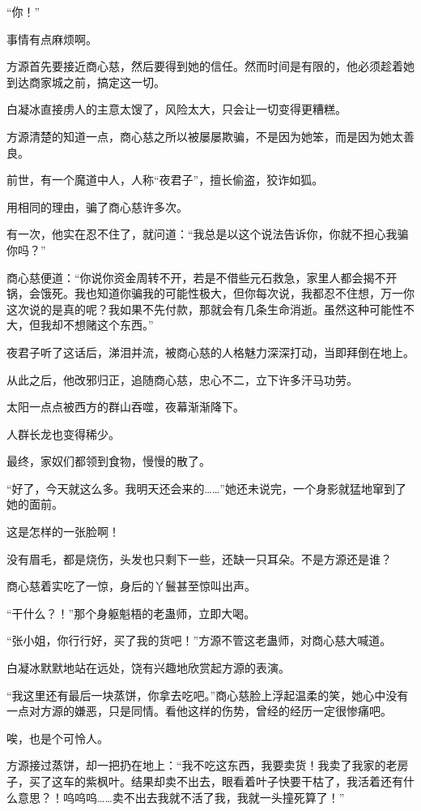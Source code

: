 \begin{this_body}
“你！”

事情有点麻烦啊。

方源首先要接近商心慈，然后要得到她的信任。然而时间是有限的，他必须趁着她到达商家城之前，搞定这一切。

白凝冰直接虏人的主意太馊了，风险太大，只会让一切变得更糟糕。

方源清楚的知道一点，商心慈之所以被屡屡欺骗，不是因为她笨，而是因为她太善良。

前世，有一个魔道中人，人称“夜君子”，擅长偷盗，狡诈如狐。

用相同的理由，骗了商心慈许多次。

有一次，他实在忍不住了，就问道：“我总是以这个说法告诉你，你就不担心我骗你吗？”

商心慈便道：“你说你资金周转不开，若是不借些元石救急，家里人都会揭不开锅，会饿死。我也知道你骗我的可能性极大，但你每次说，我都忍不住想，万一你这次说的是真的呢？我如果不先付款，那就会有几条生命消逝。虽然这种可能性不大，但我却不想赌这个东西。”

夜君子听了这话后，涕泪并流，被商心慈的人格魅力深深打动，当即拜倒在地上。

从此之后，他改邪归正，追随商心慈，忠心不二，立下许多汗马功劳。

太阳一点点被西方的群山吞噬，夜幕渐渐降下。

人群长龙也变得稀少。

最终，家奴们都领到食物，慢慢的散了。

“好了，今天就这么多。我明天还会来的……”她还未说完，一个身影就猛地窜到了她的面前。

这是怎样的一张脸啊！

没有眉毛，都是烧伤，头发也只剩下一些，还缺一只耳朵。不是方源还是谁？

商心慈着实吃了一惊，身后的丫鬟甚至惊叫出声。

“干什么？！”那个身躯魁梧的老蛊师，立即大喝。

“张小姐，你行行好，买了我的货吧！”方源不管这老蛊师，对商心慈大喊道。

白凝冰默默地站在远处，饶有兴趣地欣赏起方源的表演。

“我这里还有最后一块蒸饼，你拿去吃吧。”商心慈脸上浮起温柔的笑，她心中没有一点对方源的嫌恶，只是同情。看他这样的伤势，曾经的经历一定很惨痛吧。

唉，也是个可怜人。

方源接过蒸饼，却一把扔在地上：“我不吃这东西，我要卖货！我卖了我家的老房子，买了这车的紫枫叶。结果却卖不出去，眼看着叶子快要干枯了，我活着还有什么意思？！呜呜呜……卖不出去我就不活了我，我就一头撞死算了！”


\end{this_body}
